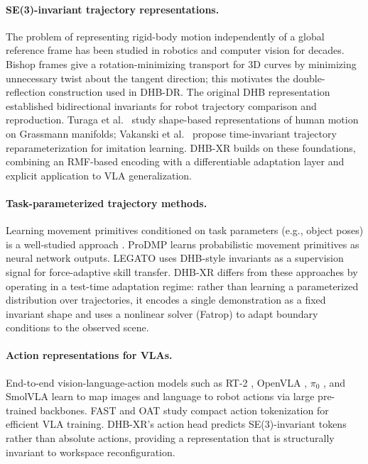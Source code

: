 \documentclass[11pt]{article}
\begin{document}
\paragraph{SE(3)-invariant trajectory representations.}
The problem of representing rigid-body motion independently of a global reference frame has been studied in robotics and computer vision for decades.
Bishop frames \cite{bishop1975parallel} give a rotation-minimizing transport for 3D curves by minimizing unnecessary twist about the tangent direction; this motivates the double-reflection construction \cite{wang2008rmf} used in DHB-DR.
The original DHB representation \cite{soloperto2015icra,lee2018autonomous} established bidirectional invariants for robot trajectory comparison and reproduction.
Turaga et al.~\cite{turaga2009grassmann} study shape-based representations of human motion on Grassmann manifolds; Vakanski et al.~\cite{vakanski2023invariant} propose time-invariant trajectory reparameterization for imitation learning.
DHB-XR builds on these foundations, combining an RMF-based encoding with a differentiable adaptation layer and explicit application to VLA generalization.

\paragraph{Task-parameterized trajectory methods.}
Learning movement primitives conditioned on task parameters (e.g., object poses) is a well-studied approach \cite{calinon2016tutorial}.
ProDMP \cite{li2023prodmp} learns probabilistic movement primitives as neural network outputs.
LEGATO \cite{seo2025legato} uses DHB-style invariants as a supervision signal for force-adaptive skill transfer.
DHB-XR differs from these approaches by operating in a test-time adaptation regime: rather than learning a parameterized distribution over trajectories, it encodes a single demonstration as a fixed invariant shape and uses a nonlinear solver (Fatrop) to adapt boundary conditions to the observed scene.

\paragraph{Action representations for VLAs.}
End-to-end vision-language-action models such as RT-2 \cite{brohan2023rt2}, OpenVLA \cite{kim2024openvla}, $\pi_0$ \cite{black2024pi0}, and SmolVLA \cite{shukor2025smolvla} learn to map images and language to robot actions via large pre-trained backbones.
FAST \cite{pertsch2025fast} and OAT \cite{wu2024oat} study compact action tokenization for efficient VLA training.
DHB-XR's action head predicts SE(3)-invariant tokens rather than absolute actions, providing a representation that is structurally invariant to workspace reconfiguration.
\end{document}
